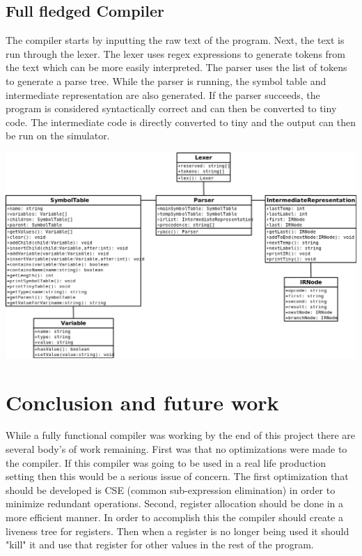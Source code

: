\documentclass[12pt]{article}
\begin{document}
        \subsection{Full fledged Compiler}
            The compiler starts by inputting the raw text of the program.
            Next, the text is run through the lexer.
            The lexer uses regex expressions to generate tokens from the text which can be more easily interpreted.
            The parser uses the list of tokens to generate a parse tree.
            While the parser is running, the symbol table and intermediate representation are also generated.
            If the parser succeeds, the program is considered syntactically correct and can then be converted to tiny code.
            The intermediate code is directly converted to tiny and the output can then be run on the simulator.
            \begin{center}
                \includegraphics[width=\linewidth]{uml}
            \end{center}

    \section{Conclusion and future work}    
            While a fully functional compiler was working by the end of this project there are several body's of work remaining.  First was that no optimizations were made to the compiler.  If this compiler was going to be used in a real life production setting then this would be a serious issue of concern.  The first optimization that should be developed is CSE (common sub-expression elimination) in order to minimize redundant operations.  Second, register allocation should be done in a more efficient manner.  In order to accomplish this the compiler should create a liveness tree for registers.  Then when a register is no longer being used it should "kill" it and use that register for other values in the rest of the program.  
            
\end{document}
